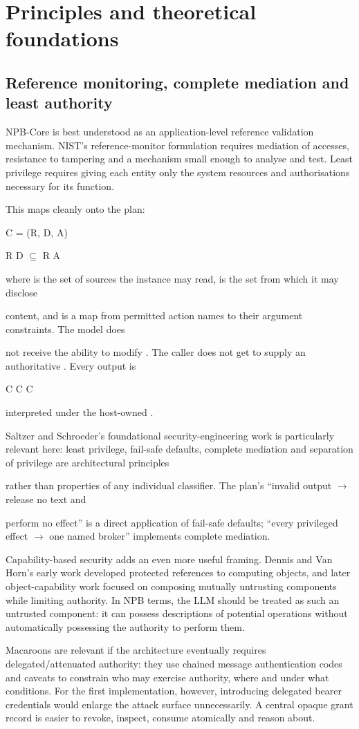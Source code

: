 \documentclass[11pt,a4paper]{article}
\begin{document}
\section*{Principles and theoretical foundations}
\subsection*{Reference monitoring, complete mediation and least authority}
NPB-Core is best understood as an application-level reference validation mechanism. NIST's reference-monitor formulation requires mediation of accesses, resistance to tampering and a mechanism small enough to analyse and test. Least privilege requires giving each entity only the system resources and authorisations necessary for its function.\par
This maps cleanly onto the plan:\par
C = (R, D, A)\par
R D  $\subseteq$ R A\par
where is the set of sources the instance may read, is the set from which it may disclose\par
content, and is a map from permitted action names to their argument constraints. The model does\par
not receive the ability to modify . The caller does not get to supply an authoritative . Every output is\par
C C C\par
interpreted under the host-owned .\par
Saltzer and Schroeder's foundational security-engineering work is particularly relevant here: least privilege, fail-safe defaults, complete mediation and separation of privilege are architectural principles\par
rather than properties of any individual classifier. The plan's “invalid output  $\rightarrow$  release no text and\par
perform no effect” is a direct application of fail-safe defaults; “every privileged effect  $\rightarrow$  one named broker” implements complete mediation.\par
Capability-based security adds an even more useful framing. Dennis and Van Horn's early work developed protected references to computing objects, and later object-capability work focused on composing mutually untrusting components while limiting authority. In NPB terms, the LLM should be treated as such an untrusted component: it can possess descriptions of potential operations without automatically possessing the authority to perform them.\par
Macaroons are relevant if the architecture eventually requires delegated/attenuated authority: they use chained message authentication codes and caveats to constrain who may exercise authority, where and under what conditions. For the first implementation, however, introducing delegated bearer credentials would enlarge the attack surface unnecessarily. A central opaque grant record is easier to revoke, inspect, consume atomically and reason about.\par
\end{document}
